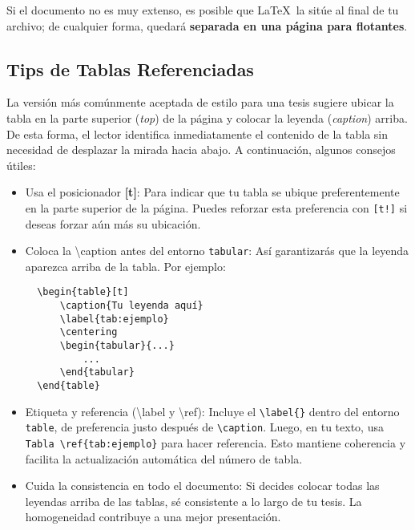 \documentclass{article}
\begin{document}
Si el documento no es muy extenso, es posible que \LaTeX\ la sitúe 
al final de tu archivo; de cualquier forma, quedará 
\textbf{separada en una página para flotantes}.

\subsection{Tips de Tablas Referenciadas}

La versión más comúnmente aceptada de estilo para una tesis sugiere ubicar la tabla 
en la parte superior (\emph{top}) de la página y colocar la leyenda (\emph{caption}) 
arriba. De esta forma, el lector identifica inmediatamente el contenido de la tabla 
sin necesidad de desplazar la mirada hacia abajo. A continuación, algunos consejos útiles:

\begin{itemize}
  \item Usa el posicionador \textbf{[t]}: Para indicar que tu tabla se ubique preferentemente 
  en la parte superior de la página. Puedes reforzar esta preferencia con \texttt{[t!]} 
  si deseas forzar aún más su ubicación.
  
  \item Coloca la \textbackslash caption antes del entorno \texttt{tabular}: Así 
  garantizarás que la leyenda aparezca arriba de la tabla. Por ejemplo:
  \begin{verbatim}
  \begin{table}[t]
      \caption{Tu leyenda aquí}
      \label{tab:ejemplo}
      \centering
      \begin{tabular}{...}
          ...
      \end{tabular}
  \end{table}
  \end{verbatim}

  \item Etiqueta y referencia (\textbackslash label y \textbackslash ref): 
  Incluye el \texttt{\textbackslash label\{\}} dentro del entorno \texttt{table}, 
  de preferencia justo después de \texttt{\textbackslash caption}. Luego, en tu texto, 
  usa \texttt{Tabla~\textbackslash ref\{tab:ejemplo\}} para hacer referencia. 
  Esto mantiene coherencia y facilita la actualización automática del número de tabla.

  \item Cuida la consistencia en todo el documento: Si decides colocar todas 
  las leyendas arriba de las tablas, sé consistente a lo largo de tu tesis. 
  La homogeneidad contribuye a una mejor presentación.


\end{itemize}
\end{document}
